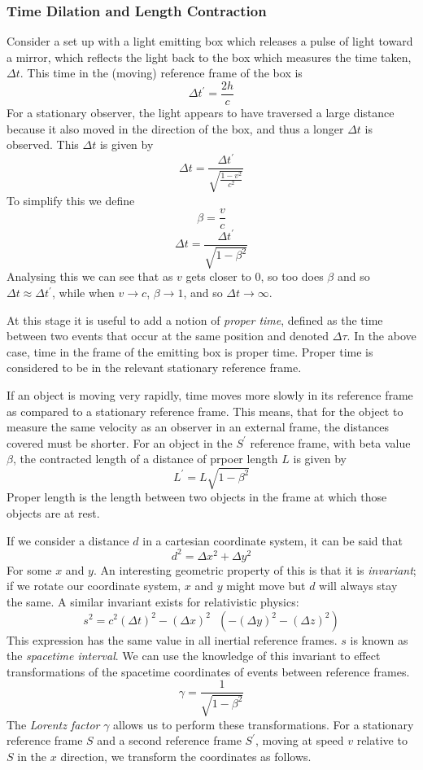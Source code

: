\documentclass[12pt]{report}
\begin{document}
\begin{flushleft}
\subsubsection*{Time Dilation and Length Contraction}
Consider a set up with a light emitting box which releases a pulse of light 
toward a mirror, which reflects the light back to the box which measures the
time taken, \(\Delta t\). This time in the (moving) reference frame of the box
is 
\[\Delta t^\prime = \frac{2h}{c}\] 
For a stationary observer, the light appears to have traversed a large distance
because it also moved in the direction of the box, and thus a longer 
\(\Delta t\) is observed. This \(\Delta t\) is given by
\[\Delta t = \frac{\Delta t^\prime}{\sqrt{\frac{1 - v^2}{c^2}}}\]
To simplify this we define
\[\beta = \frac{v}{c}\]
\[\Delta t = \frac{\Delta t^\prime}{\sqrt{1 - \beta^2}}\]
Analysing this we can see that as \(v\) gets closer to \(0\), so too does 
\(\beta\) and so \(\Delta t \approx \Delta t^\prime\), while when 
\(v \rightarrow c\), \(\beta \rightarrow 1\), and so 
\(\Delta t \rightarrow \infty\).

\bigskip
At this stage it is useful to add a notion of \textit{proper time}, defined as
the time between two events that occur at the same position and denoted 
\(\Delta \tau\). In the above case, time in the frame of the emitting box is 
proper time. Proper time is considered to be in the relevant stationary 
reference frame.

\bigskip
If an object is moving very rapidly, time moves more slowly in its reference
frame as compared to a stationary reference frame. This means, that for the
object to measure the same velocity as an observer in an external frame, the
distances covered must be shorter. For an object in the \(S^\prime\) reference
frame, with beta value \(\beta\), the contracted length of a distance of prpoer
length \(L\) is given by
\[L^\prime = L\sqrt{1 - \beta^2}\]
Proper length is the length between two objects in the frame at which those 
objects are at rest.

\bigskip
If we consider a distance \(d\) in a cartesian coordinate system, it can be
said that
\[d^2 = \Delta x^2 + \Delta y^2\]
For some \(x\) and \(y\). An interesting geometric property of this is that it
is \textit{invariant}; if we rotate our coordinate system, \(x\) and \(y\) 
might move but \(d\) will always stay the same. A similar invariant exists for
relativistic physics:
\[s^2=c^2(\Delta t)^2 - (\Delta x)^2 \:\:\: (- (\Delta y)^2 - (\Delta z)^2)\]
This expression has the same value in all inertial reference frames. \(s\) is
known as the \textit{spacetime interval}. We can use the knowledge of this 
invariant to effect transformations of the spacetime coordinates of events 
between reference frames.
\[\gamma = \frac{1}{\sqrt{1 - \beta^2}}\]
The \textit{Lorentz factor} \(\gamma\) allows us to perform these 
transformations. For a stationary reference frame \(S\) and a second reference
frame \(S^\prime\), moving at speed \(v\) relative to \(S\) in the \(x\) 
direction, we transform the coordinates as follows.


\end{flushleft}
\end{document}
